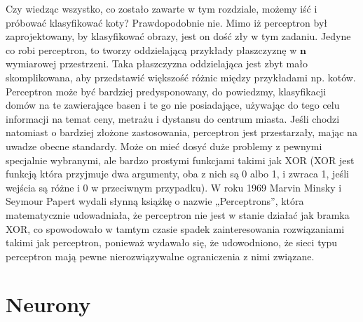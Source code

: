 Czy wiedząc wszystko, co zostało zawarte w tym rozdziale, możemy iść i próbować klasyfikować koty? Prawdopodobnie nie. Mimo iż perceptron był zaprojektowany, by klasyfikować obrazy, jest on dość zły w tym zadaniu. Jedyne co robi perceptron, to tworzy oddzielającą przykłady płaszczyznę w $\boldsymbol{n}$ wymiarowej przestrzeni. Taka płaszczyzna oddzielająca jest zbyt mało skomplikowana, aby przedstawić większość różnic między przykładami np. kotów. Perceptron może być bardziej predysponowany, do powiedzmy, klasyfikacji domów na te zawierające basen i te go nie posiadające, używając do tego celu informacji na temat ceny, metrażu i dystansu do centrum miasta. Jeśli chodzi natomiast o bardziej złożone zastosowania, perceptron jest przestarzały, mając na uwadze obecne standardy. Może on mieć dosyć duże problemy z pewnymi specjalnie wybranymi, ale bardzo prostymi funkcjami takimi jak XOR (XOR jest funkcją która przyjmuje dwa argumenty, oba z nich są 0 albo 1, i zwraca 1, jeśli wejścia są różne i 0 w przeciwnym przypadku). W roku 1969 Marvin Minsky i Seymour Papert wydali słynną książkę o nazwie „Perceptrons”, która matematycznie udowadniała, że perceptron nie jest w stanie działać jak bramka XOR, co spowodowało w tamtym czasie spadek zainteresowania rozwiązaniami takimi jak perceptron, ponieważ wydawało się, że udowodniono, że sieci typu perceptron mają pewne nierozwiązywalne ograniczenia z nimi związane.



\section{Neurony}

